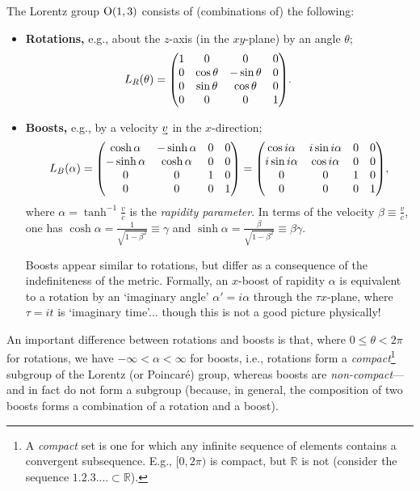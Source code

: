 \noindent
The Lorentz group $\mathrm{O}(1,3)$ consists of (combinations of) the following:
\begin{itemize}
	\item \textbf{Rotations,} e.g., about the $z$-axis (in the $xy$-plane) by an angle $\theta$;
	\begin{align}
		L_R(\theta) &= \mqty(
			1 & 0 & 0 & 0 \\
			0 & \cos\theta & -\sin\theta & 0 \\
			0 & \sin\theta & \cos\theta & 0 \\
			0 & 0 & 0 & 1 \\
		)
	.&	&
	\end{align}
	
	\item \textbf{Boosts,} e.g., by a velocity $\uvec v$ in the $x$-direction;
	\begin{align}
		L_B(\alpha) = \mqty(
			\cosh\alpha & -\sinh\alpha & 0 & 0 \\
			-\sinh\alpha & \cosh\alpha & 0 & 0 \\
			0 & 0 & 1 & 0 \\
			0 & 0 & 0 & 1 \\
		) = \mqty(
			\cos i\alpha & i\sin i\alpha & 0 & 0 \\
			i\sin i\alpha & \cos i\alpha & 0 & 0 \\
			0 & 0 & 1 & 0 \\
			0 & 0 & 0 & 1 \\
		)
	,\end{align}
	where \begin{math}
		\alpha = \tanh^{-1}\frac{v}{c}
	\end{math}
	is the \textit{rapidity parameter}.
	In terms of the velocity $\beta \equiv \frac{v}{c}$, one has $\cosh\alpha = \frac1{\sqrt{1 - \beta^2}} \equiv \gamma$ and $\sinh\alpha = \frac{\beta}{\sqrt{1 - \beta^2}} \equiv \beta\gamma$.

	\begin{note}
	Boosts appear similar to rotations, but differ as a consequence of the indefiniteness of the metric.
	Formally, an $x$-boost of rapidity $\alpha$ is equivalent to a rotation by an `imaginary angle' $\alpha' = i\alpha$ through the $\tau x$-plane, where $\tau = it$ is `imaginary time'... though this is not a good picture physically!
	\end{note}

\end{itemize}

\noindent
An important difference between rotations and boosts is that, where $0 \le \theta < 2\pi$ for rotations, we have $-\infty < \alpha < \infty$ for boosts, i.e., rotations form a \textit{compact}\footnote{A \textit{compact} set is one for which any infinite sequence of elements contains a convergent subsequence. E.g., $[0, 2\pi)$ is compact, but $\mathbb{R}$ is not (consider the sequence $\qty{1, 2, 3, ...} \subset \mathbb{R}$).} subgroup of the Lorentz (or Poincaré) group, whereas boosts are \textit{non-compact}---and in fact do not form a subgroup (because, in general, the composition of two boosts forms a combination of a rotation and a boost).

